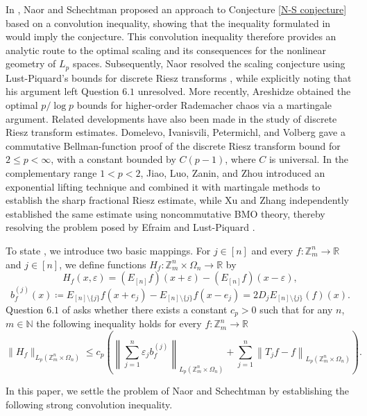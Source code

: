 \documentclass{amsart}
\numberwithin{equation}{section}
\newcommand{\Z}{{\mathbb{Z}^{n}_{m}}}
\begin{document}
In \cite[Section 6]{N-S2016}, Naor and Schechtman proposed an approach to Conjecture \ref{N-S conjecture} based on a convolution inequality, showing
that the inequality formulated in \cite[Question 6.1]{N-S2016} would imply the conjecture. This convolution inequality therefore provides an analytic route to the optimal scaling and its consequences for the nonlinear geometry of $L_{p}$ spaces. Subsequently, Naor \cite{Na2016} resolved the scaling conjecture using Lust-Piquard's bounds for discrete Riesz transforms \cite{LP1998},
while explicitly noting that his argument left Question $6.1$ unresolved. More recently, Areshidze \cite{Are2026} obtained the optimal $p/\log p$ bounds for higher-order Rademacher chaos via a martingale argument. Related developments have also been made in the study of discrete Riesz transform estimates. Domelevo, Ivanisvili, Petermichl, and Volberg \cite{D-I-P-V2026} gave a commutative Bellman-function proof of the discrete Riesz transform bound for $2\leq p<\infty$, with a constant bounded by $C(p-1)$, where $C$ is universal. In the complementary range $1<p<2$, Jiao, Luo, Zanin, and Zhou \cite{JLZZ2026} introduced an exponential lifting technique and
combined it with martingale methods to establish the sharp fractional Riesz estimate, while Xu and Zhang \cite{X-Z2026} independently established the same estimate using noncommutative BMO theory, thereby resolving the problem posed by Efraim and Lust-Piquard \cite{ELP2008}.

To state \cite[Question 6.1]{N-S2016}, we introduce two basic mappings. For $j\in [n]$ and every $f:\Z\to \mathbb{R}$ and $j\in [n]$, we define functions $H_{f}: \Z\times \Omega_{n}\to \mathbb{R}$ by
\[
H_{f}(x,\varepsilon)=(E_{[n]} f)(x+\varepsilon)-(E_{[n]} f)(x-\varepsilon),
\]
\[
b^{(j)}_{f}(x)\coloneqq E_{[n]\setminus\{j\}}f(x+e_{j})-E_{[n]\setminus \{j\}}f(x-e_{j})=2D_{j}E_{[n]\setminus\{j\}}(f)(x).
\]
Question $6.1$ of \cite{N-S2016} asks whether there exists a constant $c_{p}>0$ such that for any $n$, $m\in \mathbb{N}$ the following inequality holds for every $f:\Z\to \mathbb{R}$
\begin{equation}\label{concolution inequality of N-S}
\|H_{f}\|_{L_{p}(\Z\times\Omega_{n})}\leq c_{p}\left(\left\|\sum_{j=1}^{n}\varepsilon_{j}b^{(j)}_{f}\right\|_{L_{p}(\Z\times \Omega_{n})}+\sum_{j=1}^{n}\left\|T_{j}f-f\right\|_{L_{p}(\Z\times \Omega_{n})}\right).
\end{equation}

In this paper, we settle the problem of Naor and Schechtman \cite[Question 6.1]{N-S2016} by establishing the following strong convolution inequality.
\end{document}
